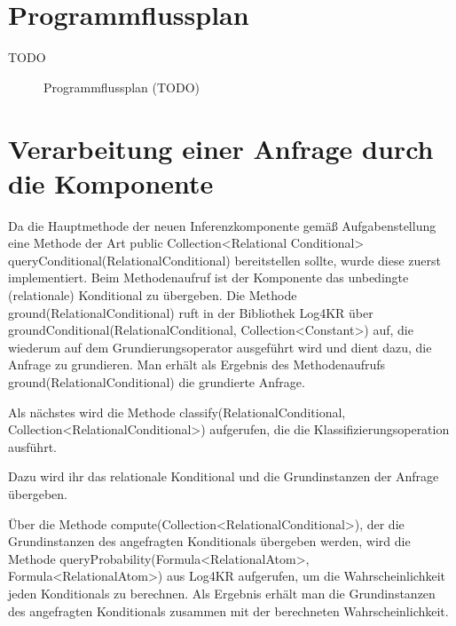 \documentclass[a4paper, 11pt]{book}
\begin{document}
{\section{Programmflussplan}
TODO
\begin{figure}[h]
	
	\caption{Programmflussplan (TODO)}
\end{figure}


\section{Verarbeitung einer Anfrage durch die Komponente}
Da die Hauptmethode der neuen Inferenzkomponente gemäß Aufgabenstellung eine Methode der Art public Collection<Relational Conditional> queryConditional(RelationalConditional) bereitstellen sollte, wurde diese zuerst  implementiert. Beim Methodenaufruf ist der Komponente das unbedingte (relationale) Konditional zu übergeben.
Die Methode ground(RelationalConditional) ruft in der Bibliothek Log4KR über groundConditional(RelationalConditional, Collection<Constant>) auf, die wiederum auf dem Grundierungsoperator ausgeführt wird und dient dazu, die Anfrage zu grundieren. Man erhält als Ergebnis des Methodenaufrufs ground(RelationalConditional) die grundierte Anfrage.

Als nächstes wird die Methode classify(RelationalConditional, Collection<RelationalConditional>) aufgerufen, die die Klassifizierungsoperation ausführt.

Dazu wird ihr das relationale Konditional und die Grundinstanzen der Anfrage übergeben.

Über die Methode compute(Collection<RelationalConditional>), der die Grundinstanzen des angefragten Konditionals übergeben werden, wird die Methode queryProbability(Formula<RelationalAtom>, Formula<RelationalAtom>) aus Log4KR aufgerufen, um die Wahrscheinlichkeit jeden Konditionals zu berechnen. Als Ergebnis erhält man die Grundinstanzen des angefragten Konditionals zusammen mit der berechneten Wahrscheinlichkeit.

}
\end{document}
